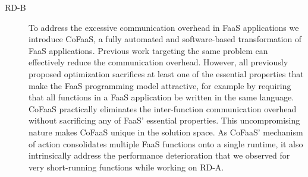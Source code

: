 \documentclass[../main.tex]{subfiles}
\begin{document}
\begin{refsection}
\begin{description}
\item[RD-B] To address the excessive communication overhead in FaaS
  applications we introduce CoFaaS, a fully automated and
  software-based transformation of FaaS applications. Previous work
  targeting the same problem can effectively reduce the communication
  overhead. However, all previously proposed optimization sacrifices
  at least one of the essential properties that make the FaaS
  programming model attractive, for example by requiring that all
  functions in a FaaS application be written in the same
  language. CoFaaS practically eliminates the inter-function
  communication overhead without sacrificing any of FaaS' essential
  properties. This uncompromising nature makes CoFaaS unique in the
  solution space. As CoFaaS' mechanism of action consolidates multiple
  FaaS functions onto a single runtime, it also intrinsically address
  the performance deterioration that we observed for very
  short-running functions while working on RD-A.

\end{description}




 


\ifx\chapincluded\undefined
  \printbibliography
  \end{refsection}
 \fi
\end{document}

